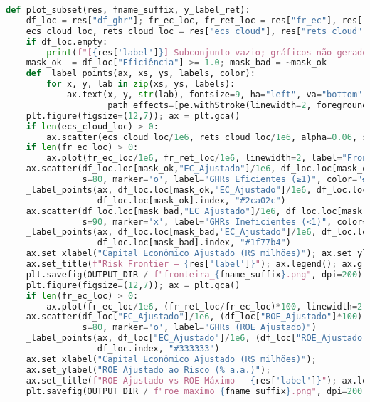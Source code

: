 \documentclass[11pt,a4paper]{article}
\newcommand{\1}{\mathbf{1}}
\begin{document}
\begin{lstlisting}[language=Python, caption={risk_frontier.py}]
def plot_subset(res, fname_suffix, y_label_ret):
    df_loc = res["df_ghr"]; fr_ec_loc, fr_ret_loc = res["fr_ec"], res["fr_ret"]
    ecs_cloud_loc, rets_cloud_loc = res["ecs_cloud"], res["rets_cloud"]
    if df_loc.empty:
        print(f"[{res['label']}] Subconjunto vazio; gráficos não gerados."); return
    mask_ok  = df_loc["Eficiência"] >= 1.0; mask_bad = ~mask_ok
    def _label_points(ax, xs, ys, labels, color):
        for x, y, lab in zip(xs, ys, labels):
            ax.text(x, y, str(lab), fontsize=9, ha="left", va="bottom", color=color,
                    path_effects=[pe.withStroke(linewidth=2, foreground="white")])
    plt.figure(figsize=(12,7)); ax = plt.gca()
    if len(ecs_cloud_loc) > 0:
        ax.scatter(ecs_cloud_loc/1e6, rets_cloud_loc/1e6, alpha=0.06, s=4, label="Carteiras Simuladas")
    if len(fr_ec_loc) > 0:
        ax.plot(fr_ec_loc/1e6, fr_ret_loc/1e6, linewidth=2, label="Fronteira Eficiente")
    ax.scatter(df_loc.loc[mask_ok,"EC_Ajustado"]/1e6, df_loc.loc[mask_ok,"Ret_Metrica"]/1e6,
               s=80, marker='o', label="GHRs Eficientes (≥1)", color="#2ca02c")
    _label_points(ax, df_loc.loc[mask_ok,"EC_Ajustado"]/1e6, df_loc.loc[mask_ok,"Ret_Metrica"]/1e6,
                  df_loc.loc[mask_ok].index, "#2ca02c")
    ax.scatter(df_loc.loc[mask_bad,"EC_Ajustado"]/1e6, df_loc.loc[mask_bad,"Ret_Metrica"]/1e6,
               s=90, marker='x', label="GHRs Ineficientes (<1)", color="#1f77b4")
    _label_points(ax, df_loc.loc[mask_bad,"EC_Ajustado"]/1e6, df_loc.loc[mask_bad,"Ret_Metrica"]/1e6,
                  df_loc.loc[mask_bad].index, "#1f77b4")
    ax.set_xlabel("Capital Econômico Ajustado (R$ milhões)"); ax.set_ylabel(y_label_ret)
    ax.set_title(f"Risk Frontier – {res['label']}"); ax.legend(); ax.grid(True); plt.tight_layout()
    plt.savefig(OUTPUT_DIR / f"fronteira_{fname_suffix}.png", dpi=200); plt.show()
    plt.figure(figsize=(12,7)); ax = plt.gca()
    if len(fr_ec_loc) > 0:
        ax.plot(fr_ec_loc/1e6, (fr_ret_loc/fr_ec_loc)*100, linewidth=2, label="ROE Máximo (Fronteira)")
    ax.scatter(df_loc["EC_Ajustado"]/1e6, (df_loc["ROE_Ajustado"]*100),
               s=80, marker='o', label="GHRs (ROE Ajustado)")
    _label_points(ax, df_loc["EC_Ajustado"]/1e6, (df_loc["ROE_Ajustado"]*100),
                  df_loc.index, "#333333")
    ax.set_xlabel("Capital Econômico Ajustado (R$ milhões)");
    ax.set_ylabel("ROE Ajustado ao Risco (% a.a.)");
    ax.set_title(f"ROE Ajustado vs ROE Máximo – {res['label']}"); ax.legend(); ax.grid(True); plt.tight_layout()
    plt.savefig(OUTPUT_DIR / f"roe_maximo_{fname_suffix}.png", dpi=200); plt.show()


\end{lstlisting}
\end{document}
